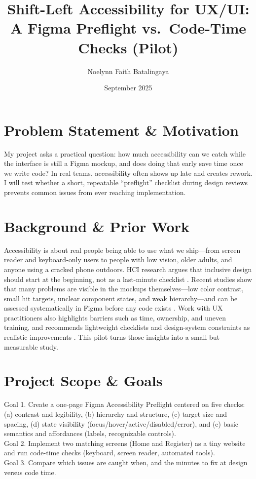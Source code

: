 \documentclass[12pt]{article}
\title{Shift-Left Accessibility for UX/UI: A Figma Preflight vs.\ Code-Time Checks (Pilot)}
\author{Noelynn Faith Batalingaya}
\date{September 2025}
\begin{document}
\maketitle

\section*{Problem Statement \& Motivation}
My project asks a practical question: how much accessibility can we catch while the interface is still a Figma mockup, and does doing that early save time once we write code? In real teams, accessibility often shows up late and creates rework. I will test whether a short, repeatable “preflight” checklist during design reviews prevents common issues from ever reaching implementation.

\section*{Background \& Prior Work}
Accessibility is about real people being able to use what we ship—from screen reader and keyboard-only users to people with low vision, older adults, and anyone using a cracked phone outdoors. HCI research argues that inclusive design should start at the beginning, not as a last-minute checklist \cite{bennett2018inclusive}. Recent studies show that many problems are visible in the mockups themselves—low color contrast, small hit targets, unclear component states, and weak hierarchy—and can be assessed systematically in Figma before any code exists \cite{huang2024a11yfigma, chen2024figmaapps}. Work with UX practitioners also highlights barriers such as time, ownership, and uneven training, and recommends lightweight checklists and design-system constraints as realistic improvements \cite{shi2023uxaccesspractice}. This pilot turns those insights into a small but measurable study.

\section*{Project Scope \& Goals}
Goal 1. Create a one-page Figma Accessibility Preflight centered on five checks: (a) contrast and legibility, (b) hierarchy and structure, (c) target size and spacing, (d) state visibility (focus/hover/active/disabled/error), and (e) basic semantics and affordances (labels, recognizable controls).\\
Goal 2. Implement two matching screens (Home and Register) as a tiny website and run code-time checks (keyboard, screen reader, automated tools).\\
Goal 3. Compare which issues are caught when, and the minutes to fix at design versus code time.
\end{document}
